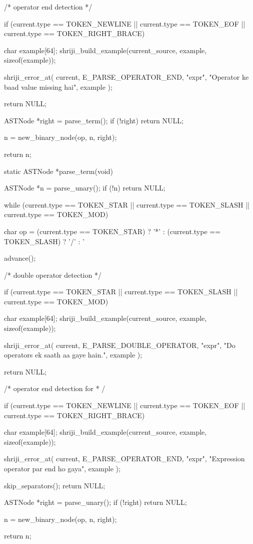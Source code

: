 \documentclass{article}
\begin{document}
{{/* operator end detection */

if (current.type == TOKEN_NEWLINE ||
    current.type == TOKEN_EOF ||
    current.type == TOKEN_RIGHT_BRACE)
{
char example[64];
shriji_build_example(current_source, example, sizeof(example));

shriji_error_at(
    current,
    E_PARSE_OPERATOR_END,
    "expr",
    "Operator ke baad value missing hai",
    example
);

    return NULL;
}

        ASTNode *right = parse_term();
        if (!right) return NULL;

        n = new_binary_node(op, n, right);
    }

    return n;
}


static ASTNode *parse_term(void)
{
    ASTNode *n = parse_unary();
    if (!n) return NULL;

    while (current.type == TOKEN_STAR ||
           current.type == TOKEN_SLASH ||
           current.type == TOKEN_MOD)
    {
        char op =
            (current.type == TOKEN_STAR)  ? '*' :
            (current.type == TOKEN_SLASH) ? '/' : '%

        advance();










/* double operator detection */

if (current.type == TOKEN_STAR ||
    current.type == TOKEN_SLASH ||
    current.type == TOKEN_MOD)
{
    char example[64];
    shriji_build_example(current_source, example, sizeof(example));

    shriji_error_at(
        current,
        E_PARSE_DOUBLE_OPERATOR,
        "expr",
        "Do operators ek saath aa gaye hain.",
        example
    );

    return NULL;
}









/* operator end detection for * / %

if (current.type == TOKEN_NEWLINE ||
    current.type == TOKEN_EOF ||
    current.type == TOKEN_RIGHT_BRACE)
{

char example[64];
shriji_build_example(current_source, example, sizeof(example));

shriji_error_at(
    current,
    E_PARSE_OPERATOR_END,
    "expr",
    "Expression operator par end ho gaya",
    example
);

skip_separators();
return NULL;

}

        ASTNode *right = parse_unary();
        if (!right) return NULL;

        n = new_binary_node(op, n, right);
    }

    return n;
}
\end{document}
